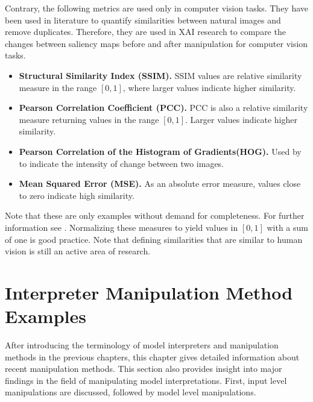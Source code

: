 \documentclass[sigconf]{acmart}
\begin{document}
Contrary, the following metrics are used only in computer vision tasks. They have been used in literature to quantify similarities between natural images and remove duplicates. Therefore, they are used in XAI research to compare the changes between saliency maps before and after manipulation for computer vision tasks.
\begin{itemize}
    \item \textbf{Structural Similarity Index (SSIM).} SSIM values are relative similarity measure in the range $\left[0, 1\right]$, where larger values indicate higher similarity.
    \item \textbf{Pearson Correlation Coefficient (PCC).} PCC is also a relative similarity measure returning values in the range $\left[0, 1\right]$. Larger values indicate higher similarity.
    \item \textbf{Pearson Correlation of the Histogram of Gradients\newline (HOG). } Used by \cite{adebayo2018sanity} to indicate the intensity of change between two images. 
    \item \textbf{Mean Squared Error (MSE).} As an absolute error measure, values close to zero indicate high similarity. 
\end{itemize}

\noindent Note that these are only examples without demand for completeness. For further information see \cite{adebayo2018sanity}.
Normalizing these measures to yield values in $\left[0, 1\right]$ with a sum of one is good practice. 
Note that defining similarities that are similar to human vision is still an active area of research. 

% 
\section{Interpreter Manipulation Method Examples}
\label{sec:manipulations}

After introducing the terminology of model interpreters and manipulation methods in the previous chapters, this chapter gives detailed information about recent manipulation methods. This section also provides insight into major findings in the field of manipulating model interpretations. First, input level manipulations are discussed, followed by model level manipulations. 
\end{document}
